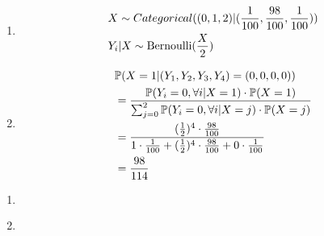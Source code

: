 \documentclass{article}
\begin{document}
\begin{enumerate}
  \item \begin{align*}
  & X \sim Categorical((0,1,2) | (\frac{1}{100}, \frac{98}{100}, \frac{1}{100}))\\
  & Y_i | X \sim \Bernoulli(\frac{X}{2})
  \end{align*}

  \item \begin{align*}
    & \P(X = 1 | (Y_1, Y_2, Y_3, Y_4) = (0,0,0,0)) \\
    & = \frac{\P(Y_i = 0, \forall i | X = 1) \cdot \P(X = 1)}{\sum_{j = 0}^2 \P(Y_i = 0, \forall i | X = j) \cdot \P(X = j)}\\
    & = \frac{(\frac12)^4  \cdot \frac{98}{100}}{1\cdot \frac{1}{100} + (\frac12)^4 \cdot \frac{98}{100} + 0 \cdot \frac{1}{100}}\\
    & = \frac{98}{114}
  \end{align*}
\end{enumerate}


\begin{enumerate}
  \item 
  \begin{lstlisting}[language=R]
    
  \end{lstlisting}
  
  
  \item 
\end{enumerate}









 
\end{document}

